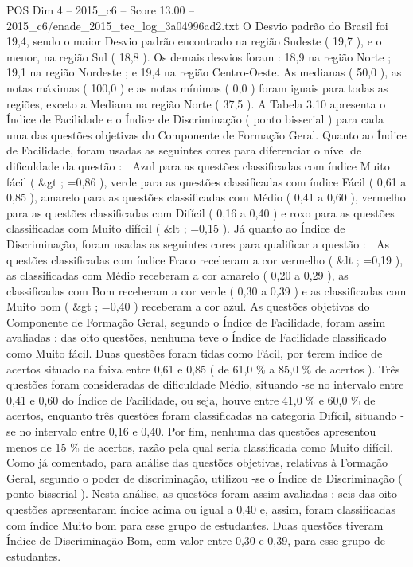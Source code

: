 \begin{textsample}{POS Dim 4 – 2015\_c6 – Score 13.00 – 2015\_c6/enade\_2015\_tec\_log\_3a04996ad2.txt}
O Desvio padrão do Brasil foi 19,4, sendo o maior Desvio padrão encontrado na região Sudeste ( 19,7 ), e o menor, na região Sul ( 18,8 ).
Os demais desvios foram : 18,9 na região Norte ; 19,1 na região Nordeste ; e 19,4 na região Centro-Oeste.
As medianas ( 50,0 ), as notas máximas ( 100,0 ) e as notas mínimas ( 0,0 ) foram iguais para todas as regiões, exceto a Mediana na região Norte ( 37,5 ).
A Tabela 3.10 apresenta o Índice de Facilidade e o Índice de Discriminação ( ponto bisserial ) para cada uma das questões objetivas do Componente de Formação Geral.
Quanto ao Índice de Facilidade, foram usadas as seguintes cores para diferenciar o nível de dificuldade da questão :  Azul para as questões classificadas com índice Muito fácil ( \&gt ; =0,86 ), verde para as questões classificadas com índice Fácil ( 0,61 a 0,85 ), amarelo para as questões classificadas com Médio ( 0,41 a 0,60 ), vermelho para as questões classificadas com Difícil ( 0,16 a 0,40 ) e roxo para as questões classificadas com Muito difícil ( \&lt ; =0,15 ).
Já quanto ao Índice de Discriminação, foram usadas as seguintes cores para qualificar a questão :  As questões classificadas com índice Fraco receberam a cor vermelho ( \&lt ; =0,19 ), as classificadas com Médio receberam a cor amarelo ( 0,20 a 0,29 ), as classificadas com Bom receberam a cor verde ( 0,30 a 0,39 ) e as classificadas com Muito bom ( \&gt ; =0,40 ) receberam a cor azul.
As questões objetivas do Componente de Formação Geral, segundo o Índice de Facilidade, foram assim avaliadas : das oito questões, nenhuma teve o Índice de Facilidade classificado como Muito fácil.
Duas questões foram tidas como Fácil, por terem índice de acertos situado na faixa entre 0,61 e 0,85 ( de 61,0 \% a 85,0 \% de acertos ).
Três questões foram consideradas de dificuldade Médio, situando -se no intervalo entre 0,41 e 0,60 do Índice de Facilidade, ou seja, houve entre 41,0 \% e 60,0 \% de acertos, enquanto três questões foram classificadas na categoria Difícil, situando -se no intervalo entre 0,16 e 0,40.
Por fim, nenhuma das questões apresentou menos de 15 \% de acertos, razão pela qual seria classificada como Muito difícil.
Como já comentado, para análise das questões objetivas, relativas à Formação Geral, segundo o poder de discriminação, utilizou -se o Índice de Discriminação ( ponto bisserial ).
Nesta análise, as questões foram assim avaliadas : seis das oito questões apresentaram índice acima ou igual a 0,40 e, assim, foram classificadas com índice Muito bom para esse grupo de estudantes.
Duas questões tiveram Índice de Discriminação Bom, com valor entre 0,30 e 0,39, para esse grupo de estudantes.

\end{textsample}
